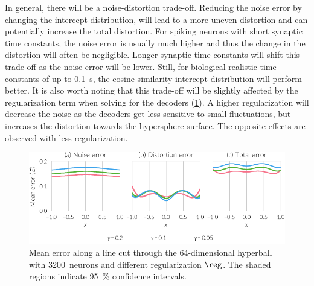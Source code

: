 In general, there will be a noise-distortion trade-off.
Reducing the noise error by changing the intercept distribution, will lead to a more uneven distortion and can potentially increase the total distortion.
For spiking neurons with short synaptic time constants, the noise error is usually much higher and thus the change in the distortion will often be negligible.
Longer synaptic time constants will shift this trade-off as the noise error will be lower.
Still, for biological realistic time constants of up to \SI{0.1}{\second}, the cosine similarity intercept distribution will perform better.
It is also worth noting that this trade-off will be slightly affected by the regularization term when solving for the decoders (\cref{fig:error-cs-intercepts-reg}).
A higher regularization will decrease the noise as the decoders get less sensitive to small fluctuations, but increases the distortion towards the hypersphere surface.
The opposite effects are observed with less regularization.
\begin{figure}
    \centering
    \includegraphics{figures/error-cs-intercepts-reg}
    \caption[Mean error along line cut with different regularization]{Mean error along a line cut through the 64-dimensional hyperball with \num{3200}~neurons and different regularization $\reg$. The shaded regions indicate \SI{95}{\percent} confidence intervals.}\label{fig:error-cs-intercepts-reg}
\end{figure}

